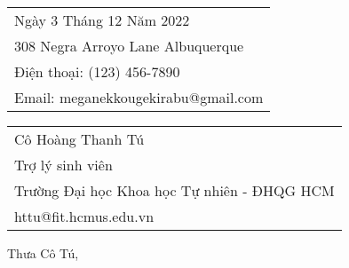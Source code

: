 \documentclass{article}
\begin{document}






\hfill
\begin{tabular}{l @{}}
	Ngày 3 Tháng 12 Năm 2022\\
	308 Negra Arroyo Lane Albuquerque \\
	Điện thoại: (123) 456-7890 \\
	Email: meganekkougekirabu@gmail.com
\end{tabular}

\bigskip %


\begin{tabular}{@{} l}
	Cô Hoàng Thanh Tú \\
	Trợ lý sinh viên \\
	Trường Đại học Khoa học Tự nhiên - ĐHQG HCM \\
	httu@fit.hcmus.edu.vn
\end{tabular}

\bigskip %

Thưa Cô Tú,

\bigskip %


\end{document}
